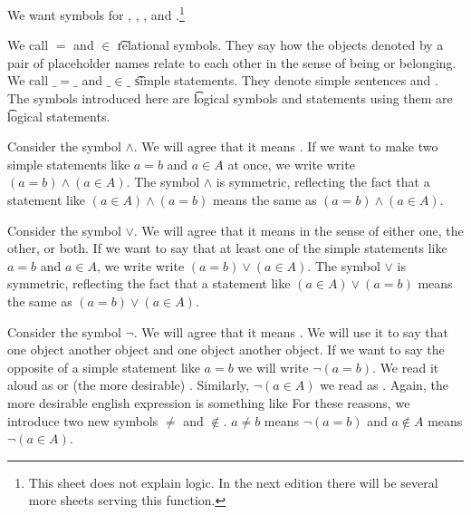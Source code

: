 

We want symbols for , , , and .\footnote{This sheet does not explain logic. In the next edition there will be several more sheets serving this function.}


We call $=$ and $\in$ \t{relational symbols}.
They say how the objects denoted by a pair of placeholder names relate to each other in the sense of being or belonging.
We call $\_=\_$ and $\_\in\_$ \t{simple statements}.
They denote simple sentences  and .
The symbols introduced here are \t{logical symbols} and statements using them are \t{logical statements}.


Consider the symbol $\land$.
We will agree that it means .
If we want to make two simple statements like $a = b$ and $a \in A$ at once, we write write $(a = b) \land (a \in A)$.
The symbol $\land$ is symmetric, reflecting the fact that a statement like $(a \in A) \land (a = b)$ means the same as $(a = b) \land (a \in A)$.


Consider the symbol $\lor$.
We will agree that it means  in the sense of either one, the other, or both.
If we want to say that  at least one of the simple statements like $a = b$ and $a \in A$, we write write $(a = b) \lor (a \in A)$.
The symbol $\lor$ is symmetric, reflecting the fact that a statement like $(a \in A) \lor (a = b)$ means the same as $(a = b) \lor (a \in A)$.


Consider the symbol $\neg$.
We will agree that it means .
We will use it to say that one object  another object and one object  another object.
If we want to say the opposite of a simple statement like $a = b$ we will write $\neg(a = b)$.
We read it aloud as  or (the more desirable) .
Similarly, $\neg(a \in A)$ we read as .
Again, the more desirable english expression is something like 
For these reasons, we introduce two new symbols $\neq$ and $\not\in$.
$a \neq b$ means $\neg(a = b)$ and $a \not\in A$ means $\neg(a \in A)$.

